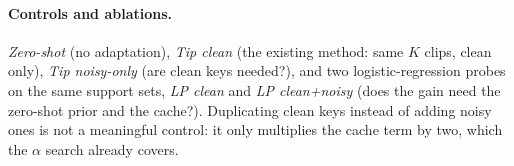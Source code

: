 \paragraph{Controls and ablations.}
\emph{Zero-shot} (no adaptation), \emph{Tip clean} (the existing method: same $K$ clips, clean only),
\emph{Tip noisy-only} (are clean keys needed?), and two logistic-regression probes on the same support sets,
\emph{LP clean} and \emph{LP clean+noisy} (does the gain need the zero-shot prior and the cache?).
Duplicating clean keys instead of adding noisy ones is not a meaningful control: it only multiplies the cache term by two, which the $\alpha$ search already covers.
